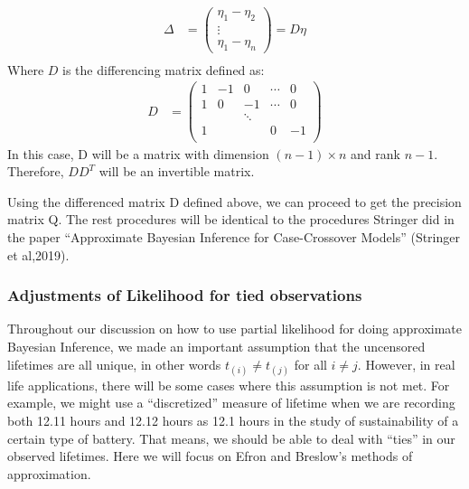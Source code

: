 \documentclass[]{article}
\begin{document}
\begin{equation}\begin{aligned}\label{eqn:D1}
\Delta &= \begin{pmatrix}\eta_{1} - \eta_{2} \\ \vdots \\ \eta_{1} - \eta_{n} \end{pmatrix} = D\eta \\
\end{aligned}\end{equation} Where \(D\) is the differencing matrix
defined as: \begin{equation}\begin{aligned}\label{eqn:D2}
D &= \begin{pmatrix}
1 & -1 & 0 & \cdots & 0 \\
1 & 0 & -1 & \cdots & 0 \\
  &    & \ddots &   &   \\
1 &    &       & 0 & -1 \\
\end{pmatrix}
\end{aligned}\end{equation} In this case, D will be a matrix with
dimension \((n-1)\times n\) and rank \(n-1\). Therefore, \(DD^T\) will
be an invertible matrix.

Using the differenced matrix D defined above, we can proceed to get the
precision matrix Q. The rest procedures will be identical to the
procedures Stringer did in the paper ``Approximate Bayesian Inference
for Case-Crossover Models'' (Stringer et al,2019).

\hypertarget{adjustments-of-likelihood-for-tied-observations}{%
\subsubsection{Adjustments of Likelihood for tied
observations}\label{adjustments-of-likelihood-for-tied-observations}}

Throughout our discussion on how to use partial likelihood for doing
approximate Bayesian Inference, we made an important assumption that the
uncensored lifetimes are all unique, in other words
\(t_{(i)} \ne t_{(j)}\) for all \(i\neq j\). However, in real life
applications, there will be some cases where this assumption is not met.
For example, we might use a ``discretized'' measure of lifetime when we
are recording both 12.11 hours and 12.12 hours as 12.1 hours in the
study of sustainability of a certain type of battery. That means, we
should be able to deal with ``ties'' in our observed lifetimes. Here we
will focus on Efron and Breslow's methods of approximation.
\end{document}
